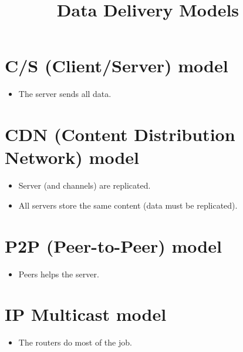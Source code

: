 \title{Data Delivery Models~\cite{transmission-models}}

\maketitle
\tableofcontents

\section{C/S (Client/Server) model}
\begin{itemize}
\item The server sends all data.
\end{itemize}

\section{CDN (Content Distribution Network) model}
\begin{itemize}
\item Server (and channels) are replicated.
\item All servers store the same content (data must be replicated).
\end{itemize}

\section{P2P (Peer-to-Peer) model}
\begin{itemize}
\item Peers helps the server.
\end{itemize}

\section{IP Multicast model}
\begin{itemize}
\item The routers do most of the job.
\end{itemize}


